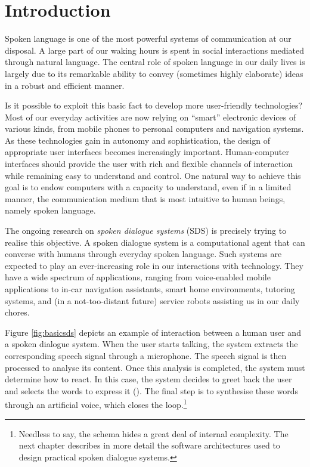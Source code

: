 
\chapter{Introduction}
\setcounter{page}{1}
\pagestyle{plain}

Spoken language is one of the most powerful systems of communication at our disposal. A large part of our waking hours is spent in social interactions mediated through natural language.  The central role of spoken language in our daily lives is largely due to its remarkable ability to convey (sometimes highly elaborate) ideas in a robust and efficient manner. 

Is it possible to exploit this basic fact to develop more user-friendly technologies? Most of our everyday activities are now relying on ``smart'' electronic devices of various kinds, from mobile phones to personal computers and navigation systems. As these technologies gain in autonomy and sophistication, the design of appropriate user interfaces becomes increasingly important. Human-computer interfaces should provide the user with rich and flexible channels of interaction while remaining easy to understand and control. One natural way to achieve this goal is to endow computers with a capacity to understand, even if in a limited manner, the communication medium that is most intuitive to human beings, namely spoken language.  

The ongoing research on \textit{spoken dialogue systems} (SDS) is precisely trying to realise this objective. A spoken dialogue system is a computational agent that can converse with humans through everyday spoken language. Such systems are expected to play an ever-increasing role in our interactions with technology. They have a wide spectrum of applications, ranging from voice-enabled mobile applications to in-car navigation assistants, smart home environments, tutoring systems, and (in a not-too-distant future) service robots assisting us in our daily chores.

Figure \ref{fig:basicsds} depicts an example of interaction between a human user and a spoken dialogue system. When the user starts talking, the system extracts the corresponding speech signal through a microphone.  The speech signal is then processed to analyse its content.  Once this analysis is completed, the system must determine how to react.  In this case, the system decides to greet back the user and selects the words to express it (). The final step is to synthesise these words through an artificial voice, which closes the loop.\footnote{ Needless to say, the schema hides a great deal of internal complexity.  The next chapter describes in more detail the software architectures used to design practical spoken dialogue systems.}

